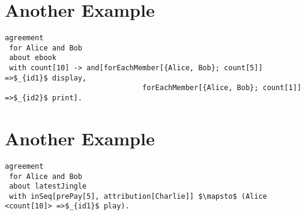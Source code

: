 \section {Another Example}
\lstset{language=Pucella2006}
\begin{minipage}[c]{0.95\textwidth}
\begin{lstlisting}[frame=single, caption={Agreement of Example 2.5}, label={lst:pucellatwofiveexampleAST}, mathescape]
agreement
 for Alice and Bob 
 about ebook 
 with count[10] -> and[forEachMember[{Alice, Bob}; count[5]] =>$_{id1}$ display, 
                                forEachMember[{Alice, Bob}; count[1]] =>$_{id2}$ print].
\end{lstlisting}
\end{minipage} 
%
\section {Another Example}
\lstset{language=Pucella2006}
\begin{minipage}[c]{0.95\textwidth}
\begin{lstlisting}[frame=single, caption={Agreement of Example 2.6}, label={lst:pucellatwosixexampleAST}, mathescape]
agreement
 for Alice and Bob 
 about latestJingle 
 with inSeq[prePay[5], attribution[Charlie]] $\mapsto$ (Alice <count[10]> =>$_{id1}$ play). 
                                    
\end{lstlisting}
\end{minipage} 
%
%
